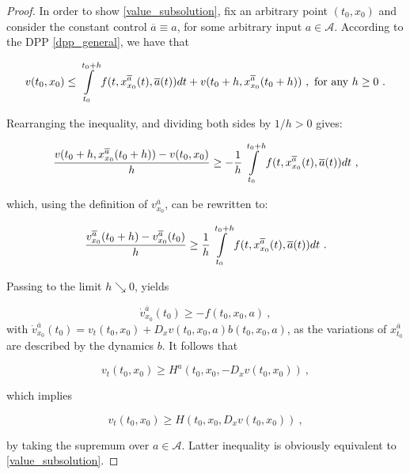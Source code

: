 \begin{theorem}
\begin{proof}
		In order to show \eqref{value_subsolution}, fix an arbitrary point $ (t_0, x_0) $ and consider the constant control $ \overline{a} \equiv a $, for some arbitrary input $ a \in \mathcal{A} $.
		According to the DPP \eqref{dpp_general}, we have that
		
		\begin{equation*}
			v(t_0, x_0) \leq \pathint{\overline{a}}{t_0}{t_0 + h} + v(t_0 + h,  x^{\overline{a}}_{x_0}(t_0 + h)) \ , \hbox{ for any } h \geq 0 \ .
		\end{equation*}
		
		Rearranging the inequality, and dividing both sides by $ 1 / h > 0 $ gives:
		
		\begin{equation}
			\label{diff_quotient_sub}
			\frac{v(t_0 + h, x^{\overline{a}}_{x_0}(t_0 + h)) - v(t_0, x_0)}{h} \geq - \frac{1}{h} \pathint{\overline{a}}{t_0}{t_0 + h} \ ,
		\end{equation}
		
		which, using the definition of $ v^{\overline{a}}_{x_0} $, can be rewritten to:
		
		\begin{equation*}
			\frac{v^{\overline{a}}_{x_0}(t_0 + h) - v^{\overline{a}}_{x_0}(t_0)}{h} \geq \frac{1}{h} \pathint{\overline{a}}{t_0}{t_0 + h} \ .
		\end{equation*}
		
		Passing to the limit $ h \searrow 0 $, yields
		
		\begin{equation*}
			\dot{v}^{\overline{a}}_{x_0}(t_0) \geq - f(t_0, x_0, a) \ ,
		\end{equation*}
		with $ \dot{v}^{\overline{a}}_{x_0}(t_0) = v_t(t_0, x_0) +  D_x v(t_0, x_0, a) b(t_0, x_0, a) $, as the variations of $ x^{\overline{a}}_{t_0} $ are described by the dynamics $ b $. It follows that
		
		\begin{equation*}
			v_t(t_0, x_0) \geq H^{a}(t_0, x_0, - D_x v(t_0, x_0)) \ ,
		\end{equation*}
		
		which implies
		
		\begin{equation*}
			v_t(t_0, x_0) \geq H(t_0, x_0, D_x v(t_0, x_0)) \ ,
		\end{equation*}
		
		by taking the supremum over $ a \in \mathcal{A} $. Latter inequality is obviously equivalent to \eqref{value_subsolution}.
		

\end{proof}
\end{theorem}
